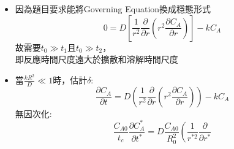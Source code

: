 \documentclass[../main.tex]{subfiles}
\begin{document}
\begin{itemize}
\begin{enumerate}
\begin{itemize}
\begin{align}
        C_{A0}: &\quad [mol][L]^{-3} \nonumber\\
        k: &\quad [T]^{-1} \nonumber\\
        N_A: &\quad [mol][L]^{-2}[T]^{-1}\\
        M_A: &\quad [M][mol]^{-1} \nonumber\\
        \rho: &\quad [M][L]^{-3} \nonumber
      \end{align}
      發現有三個表示方式:\\
      分別為:
      \begin{equation}
        t_0 [T] \sim  k^{-1} [T]
      \end{equation}
      以及
      \begin{equation}
        t_1 [T] \sim \frac{R_0^2}{D} [T]
      \end{equation}
      或
      \begin{equation}
        t_2 [T] \sim \frac{C_{A0} R_0^3}{D N_A} [T]
      \end{equation}
      三個特徵時間分別可以代表:
      \begin{itemize}
        \item $t_0$: 反應時間尺度
        \item $t_1$: 擴散時間尺度
        \item $t_2$: 溶解時間尺度
      \end{itemize}
      \item 因為題目要求能將Governing Equation換成穩態形式
      \begin{equation}
        0 = D\left[
          \frac{1}{r^2}\frac{\partial}{\partial r}\left(
            r^2\frac{\partial C_A}{\partial r}
          \right)
        \right] - k C_A
      \end{equation}
      故需要$t_0 \gg t_1$且$t_0 \gg t_2$，\\
      即反應時間尺度遠大於擴散和溶解時間尺度
      \item 當$\frac{kR^2}{D} \ll 1$時，估計$\delta$:
      \begin{equation}
        \frac{\partial C_A}{\partial t} = D \left(
          \frac{1}{r^2}\frac{\partial}{\partial r} 
          \left(
            r^2 \frac{\partial C_A}{\partial r}
          \right)
        \right) - k C_A
      \end{equation}
      無因次化:
      \begin{equation}
        \frac{C_{A0}}{t_c} \frac{\partial C_A^\ast}{\partial t^\ast} = D \frac{C_{A0}}{R_0^2} \left(
          \frac{1}{r^{\ast 2}}\frac{\partial}{\partial r^\ast} 

\end{equation}
\end{itemize}
\end{enumerate}
\end{itemize}
\end{document}
